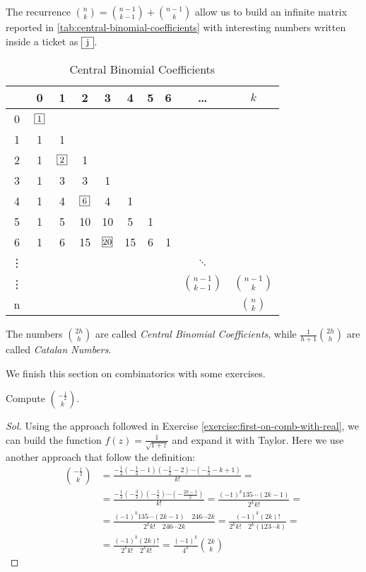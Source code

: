 The recurrence $ {{n}\choose{k}} = {{n-1}\choose{k-1}} +
{{n-1}\choose{k}}$ allow us to build an infinite matrix reported in
\autoref{tab:central-binomial-coefficients} with interesting numbers
written inside a ticket as $\ticket{j}$.
\begin{table}[ht]
  \caption{Central Binomial Coefficients}
  \label{tab:central-binomial-coefficients}
  \begin{center}
    \begin{tabular}{c|ccccccccc}
      & 0 & 1 & 2 & 3 & 4 & 5 & 6 & \ldots & $k$ \\
      \hline
      0 & $\ticket{1}$ &  &  &  & & &  &  &\\
      1 & 1 & 1 &  &  & & & && \\
      2 & 1 & $\ticket{2}$ & 1 &  & & & && \\
      3 & 1 & 3 & 3 & 1 &  & &&&  \\
      4 & 1 & 4 & $\ticket{6}$ & 4 & 1 & &&&  \\
      5 & 1 & 5 & 10 & 10 & 5 & 1&&&  \\
      6 & 1 & 6 & 15 & $\ticket{20}$ & 15 & 6& 1&&  \\
      \vdots&  &  &  &  &  & &&$\ddots$&  \\
      \vdots&  && & & & &  & ${{n-1}\choose{k-1}} $  & ${{n-1}\choose{k}} $  \\
      n&  &  & &  & &&  & & ${{n}\choose{k}} $ \\
    \end{tabular}
  \end{center}
\end{table}
The numbers ${{2h}\choose{h}}$ are called \emph{Central Binomial
  Coefficients}, while $ \frac{1}{h+1}{{2h}\choose{h}}$ are called
\emph{Catalan Numbers}.

We finish this section on combinatorics with some exercises.
\begin{exercise}
  Compute ${{ -\frac{1}{2} }\choose{k}} $.
\end{exercise}
\begin{proof}[Sol]
  Using the approach followed in Exercise
  \autoref{exercise:first-on-comb-with-real}, we can build the
  function $f(z) = \frac{1}{\sqrt{1+z}} $ and expand it with
  Taylor. Here we use another approach that follow the definition:
  \begin{displaymath}
    \begin{split}
      {{- \frac{1}{2} }\choose{k}} &= \frac{- \frac{1}{2}(- \frac{1}{2}
        -1)(- \frac{1}{2}-2)\cdots(- \frac{1}{2}-k +1) }{k!} = \\
      &= \frac{- \frac{1}{2}(- \frac{3}{2})(- \frac{5}{2})\cdots(-
        \frac{2k-1}{2}) }{k!} =
      \frac{(-1)^k 1 3 5\cdots (2k-1) }{2^k k!} =\\
      &=\frac{(-1)^k 1 3 5\cdots (2k-1) \quad 2 4 6\cdots 2k } {2^k
        k!\quad 2 4 6\cdots 2k } = \frac{(-1)^k (2k)! }
      {2^k k!\quad 2^k(1 2 3 \cdots k) } =\\
      &= \frac{(-1)^k (2k)! } {2^k k!\quad 2^kk! } =\frac{(-1)^k}{4^k }
      {{2k}\choose{k}}
    \end{split}
  \end{displaymath}
\end{proof}
